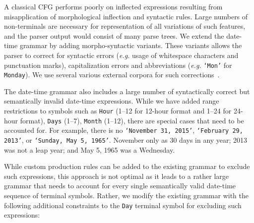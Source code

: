 A classical CFG performs poorly on inflected expressions resulting from misapplication of morphological inflection and syntactic rules. Large numbers of non-terminals are necessary for representation of all variations of such features, and the parser output would consist of many parse trees. We extend the date-time grammar by adding morpho-syntactic variants. These variants allows the parser to correct for syntactic errors (\textit{e.g.} usage of whitespace characters and punctuation marks), capitalization errors and abbreviations (\textit{e.g.} \texttt{`Mon'} for \texttt{Monday}). We use several various external corpora for such corrections~\cite{nltkcorpora}.

The date-time grammar also includes a large number of syntactically correct but semantically invalid
date-time expressions. While we have added range restrictions to symbols such as \texttt{Hour} (1--12 for 12-hour format and 1--24 for 24-hour format), \texttt{Days} (1--7), \texttt{Month} (1--12), there are special cases that need to be accounted for. For example, there is no  \texttt{`November 31, 2015'}, \texttt{`February 29, 2013'}, or \texttt{`Sunday, May  5, 1965'}. November only as 30 days in any year; 2013 was not a leap year; and May 5, 1965 was a Wednesday.

While custom production rules can be added to the existing grammar to exclude such expressions, this approach is not optimal as it leads to a rather large grammar that needs to account for every single semantically valid date-time sequence of terminal symbols. Rather, we modify the existing grammar with the following additional constraints to the \texttt{Day} terminal symbol for excluding such expressions:

